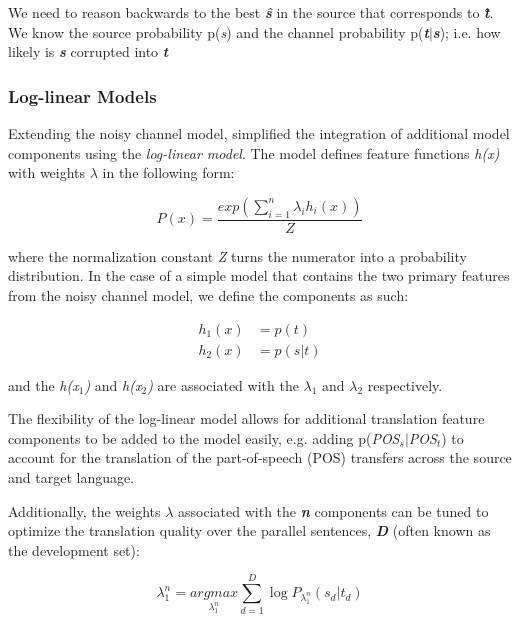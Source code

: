 We need to reason backwards to the best \emph{\textbf{\^{s}}} in the source that corresponds to \emph{\textbf{\^{t}}}. We know the source probability p(\emph{s}) and the channel probability p(\emph{\textbf{t}}${|}$\emph{\textbf{s}}); i.e. how likely is \emph{\textbf{s}} corrupted into \emph{\textbf{t}}

\subsubsection{Log-linear Models}

Extending the noisy channel model, \cite{ochneymaxentsmt} simplified the integration of additional model components using the \emph{log-linear model}. The model defines feature functions \emph{h(x)} with weights ${\lambda}$ in the following form:

\begin{equation}
P(x)=\frac { exp(\sum _{ i=1 }^{ n }{ { \lambda  }_{ i }{ h }_{ i }(x) }) }{ Z } 
\end{equation}

where the normalization constant \emph{Z} turns the numerator into a probability distribution. In the case of a simple model that contains the two primary features from the noisy channel model, we define the components as such:

\begin{equation}
\begin{aligned}
{ h }_{ 1 }(x) &= p(t) \\
{ h }_{ 2 }(x) &= p(s|t)
\end{aligned}
\end{equation}

and the \emph{h(x${_1}$)} and \emph{h(x${_2}$)} are associated with the ${\lambda}$${_1}$ and ${\lambda}$${_2}$ respectively. 

The flexibility of the log-linear model allows for additional translation feature components to be added to the model easily, e.g. adding p(\emph{POS${_s}$}${|}$\emph{POS${_t}$}) to account for the translation of the part-of-speech (POS) transfers across the source and target language. 

Additionally, the weights ${\lambda}$ associated with the \emph{\textbf{n}} components can be tuned to optimize the translation quality over the parallel sentences, \emph{\textbf{D}} (often known as the development set):

\begin{equation}
{ \lambda  }_{ 1 }^{ n }=\underset { { \lambda  }_{ 1 }^{ n } }{ argmax } \sum _{ d=1 }^{ D }{ \log { { P }_{ { \lambda  }_{ 1 }^{ n } }({ s }_{ d }|{ t }_{ d}) }  } 
\end{equation}
 
 